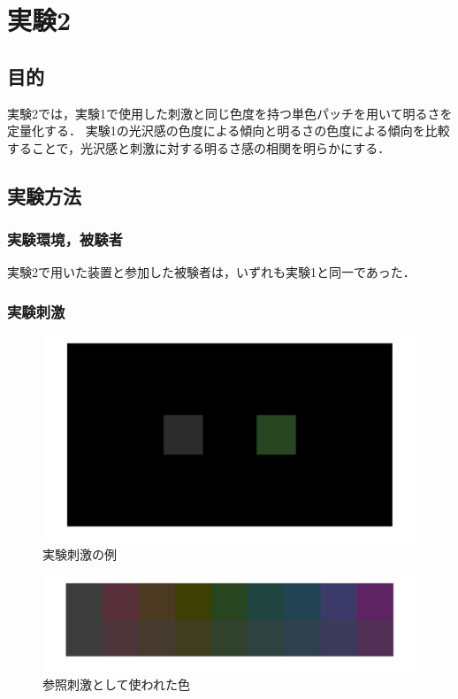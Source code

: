 \chapter{実験2}

\section{目的}

    実験2では，実験1で使用した刺激と同じ色度を持つ単色パッチを用いて明るさを定量化する．
    実験1の光沢感の色度による傾向と明るさの色度による傾向を比較することで，光沢感と刺激に対する明るさ感の相関を明らかにする．


\section{実験方法}
    \subsection{実験環境，被験者}

        実験2で用いた装置と参加した被験者は，いずれも実験1と同一であった．

    \subsection{実験刺激}

        \begin{figure}[h]
            \centering
            \includegraphics[width=14.0cm]{./img/ex2_stimuli2.png}
            \caption{実験刺激の例}
            \label{ex2_stimuli}
        \end{figure}

        \begin{figure}[h]
            \centering
            \includegraphics[width=14.0cm]{./img/patchStimuli.png}
            \caption{参照刺激として使われた色}
            \label{ex2_stimuli_set}
        \end{figure}
        \newpage

